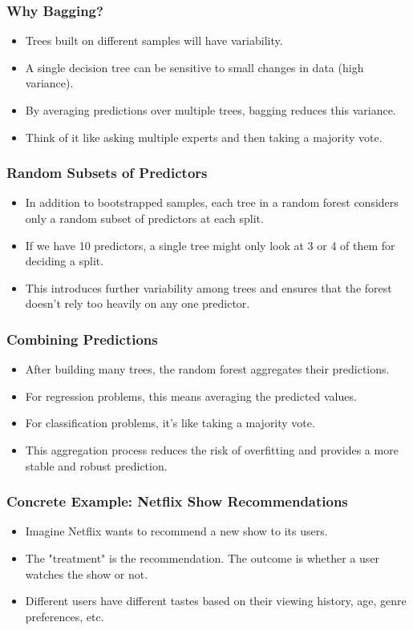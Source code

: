 \documentclass{beamer}
\begin{document}
\begin{frame}
\frametitle{Why Bagging?}
\begin{itemize}
\item Trees built on different samples will have variability.
\item A single decision tree can be sensitive to small changes in data (high variance).
\item By averaging predictions over multiple trees, bagging reduces this variance.
\item Think of it like asking multiple experts and then taking a majority vote.
\end{itemize}
\end{frame}

\begin{frame}
\frametitle{Random Subsets of Predictors}
\begin{itemize}
\item In addition to bootstrapped samples, each tree in a random forest considers only a random subset of predictors at each split.
\item If we have 10 predictors, a single tree might only look at 3 or 4 of them for deciding a split.
\item This introduces further variability among trees and ensures that the forest doesn't rely too heavily on any one predictor.
\end{itemize}
\end{frame}

\begin{frame}
\frametitle{Combining Predictions}
\begin{itemize}
\item After building many trees, the random forest aggregates their predictions.
\item For regression problems, this means averaging the predicted values.
\item For classification problems, it's like taking a majority vote.
\item This aggregation process reduces the risk of overfitting and provides a more stable and robust prediction.
\end{itemize}
\end{frame}

\begin{frame}
\frametitle{Concrete Example: Netflix Show Recommendations}
\begin{itemize}
\item Imagine Netflix wants to recommend a new show to its users.
\item The "treatment" is the recommendation. The outcome is whether a user watches the show or not.
\item Different users have different tastes based on their viewing history, age, genre preferences, etc.
\end{itemize}
\end{frame}
\end{document}
